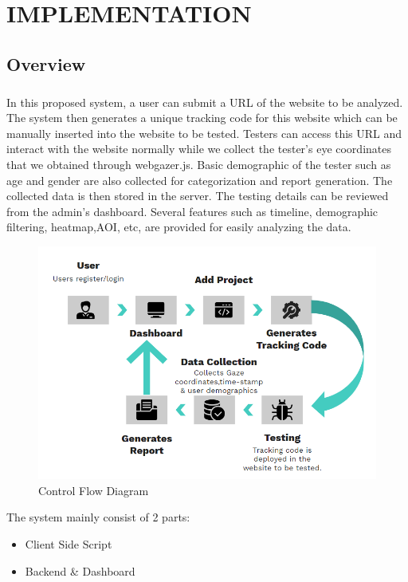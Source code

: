 \documentclass[hidelinks,12pt,a4paper,final]{extreport}
\begin{document}
\newpage
\chapter{IMPLEMENTATION}
\section{Overview}
\paragraph{}
In this proposed system, a user can submit a URL of the website to be analyzed. The system then generates a unique tracking code for this website which can be manually inserted into the website to be tested.
Testers can access this URL and interact with the website normally while we collect the tester's eye coordinates that we obtained through webgazer.js. Basic demographic of the tester such as age and gender are also collected for categorization and report generation. The collected data is then stored in the server. 
The testing details can be reviewed from the admin's dashboard. Several features such as timeline, demographic filtering, heatmap,AOI, etc, are provided for easily analyzing the data.
\begin{figure}[H]
    \centering
    \includegraphics[width=\linewidth]{proposed-method.png}
    \caption{Control Flow Diagram}
\end{figure}
The system mainly consist of 2 parts:
\begin{itemize}
	\item Client Side Script
	\item Backend \& Dashboard
\end{itemize}
\end{document}
